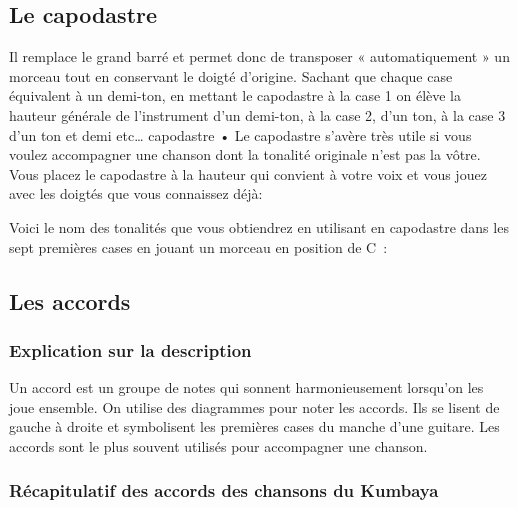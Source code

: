 \subsection{Le capodastre}
Il remplace le grand barré et permet donc de transposer « automatiquement » un morceau tout en conservant le doigté d'origine. Sachant que chaque case équivalent à un demi-ton, en mettant le capodastre à la case 1 on élève la hauteur générale de l'instrument d'un demi-ton, à la case 2, d'un ton, à la case 3 d'un ton et demi etc… capodastre • Le capodastre s'avère très utile si vous voulez accompagner une chanson dont la tonalité originale n'est pas la vôtre. Vous placez le capodastre à la hauteur qui convient à votre voix et vous jouez avec les doigtés que vous connaissez déjà:


Voici le nom des tonalités que vous obtiendrez en utilisant en capodastre dans les sept premières cases en jouant un morceau en position de C~:~


\subsection{Les accords}

\subsubsection{Explication sur la description}

Un accord est un groupe de notes qui sonnent harmonieusement lorsqu'on les joue ensemble. On utilise des diagrammes pour noter les accords. Ils se lisent de gauche à droite et symbolisent les premières cases du manche d'une guitare. Les accords sont le plus souvent utilisés pour accompagner une chanson.


\subsubsection{Récapitulatif des accords des chansons du Kumbaya}

